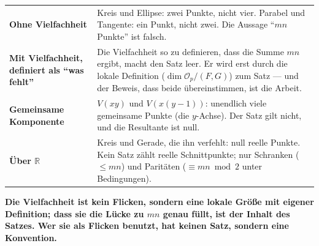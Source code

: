 \begin{warnung}
\begin{center}
{\small
\renewcommand{\arraystretch}{1.5}
\begin{tabular}{@{}P{3.4cm}P{5.4cm}@{}}
\toprule
\textbf{Ohne Vielfachheit} & Kreis und Ellipse: zwei Punkte, nicht vier. Parabel und Tangente: ein Punkt, nicht zwei. Die Aussage \enquote{$mn$ Punkte} ist falsch.\\
\textbf{Mit Vielfachheit, definiert als \enquote{was fehlt}} & Die Vielfachheit so zu definieren, dass die Summe $mn$ ergibt, macht den Satz leer. Er wird erst durch die lokale Definition ($\dim\mathcal O_p/(F, G)$) zum Satz --- und der Beweis, dass beide übereinstimmen, ist die Arbeit.\\
\textbf{Gemeinsame Komponente} & $V(xy)$ und $V(x(y - 1))$: unendlich viele gemeinsame Punkte (die $y$-Achse). Der Satz gilt nicht, und die Resultante ist null.\\
\textbf{Über $\mathbb R$} & Kreis und Gerade, die ihn verfehlt: null reelle Punkte. Kein Satz zählt reelle Schnittpunkte; nur Schranken ($\le mn$) und Paritäten ($\equiv mn \bmod 2$ unter Bedingungen).\\
\bottomrule
\end{tabular}}
\end{center}

\begin{center}
\begin{minipage}{0.9\textwidth}
\textbf{Die Vielfachheit ist kein Flicken, sondern eine lokale Größe mit eigener Definition; dass sie die Lücke zu $mn$ genau füllt, ist der Inhalt des Satzes. Wer sie als Flicken benutzt, hat keinen Satz, sondern eine Konvention.}
\end{minipage}
\end{center}

\begin{center}
\begin{minipage}{0.88\textwidth}
\end{minipage}
\end{center}
\end{warnung}

